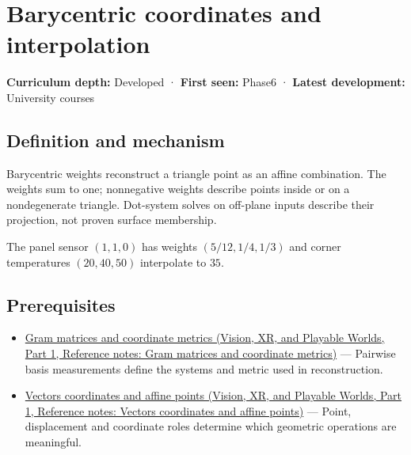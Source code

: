 \hypertarget{appendix-02b9d9a81dca}{}\label{referencestart:appendix-02b9d9a81dca}
\section{Barycentric coordinates and interpolation}\label{appendix-02b9d9a81dca-barycentric-coordinates-and-interpolation}

\hypertarget{appendix-02b9d9a81dca-barycentric-coordinates-and-interpolation}{}

\textbf{Curriculum depth:} Developed · \textbf{First seen:} Phase6 · \textbf{Latest development:} University courses

\begin{allmightroledefinition}

\subsection{Definition and mechanism}\label{appendix-02b9d9a81dca-definition-and-mechanism}

\hypertarget{appendix-02b9d9a81dca-definition-and-mechanism}{}

Barycentric weights reconstruct a triangle point as an affine combination. The weights sum to one; nonnegative weights describe points inside or on a nondegenerate triangle. Dot-system solves on off-plane inputs describe their projection, not proven surface membership.

\end{allmightroledefinition}

The panel sensor \((1,1,0)\) has weights \((5/12,1/4,1/3)\) and corner temperatures \((20,40,50)\) interpolate to \(35\).

\subsection{Prerequisites}\label{appendix-02b9d9a81dca-prerequisites}

\hypertarget{appendix-02b9d9a81dca-prerequisites}{}

\begin{itemize}
\tightlist
\item
  \href{../07-Vision-XR-and-Playable-Worlds-P01/main.pdf\#appendix-3b863809f82a}{Gram matrices and coordinate metrics (Vision, XR, and Playable Worlds, Part 1, Reference notes: Gram matrices and coordinate metrics)} --- Pairwise basis measurements define the systems and metric used in reconstruction.
\item
  \href{../07-Vision-XR-and-Playable-Worlds-P01/main.pdf\#appendix-0659864c0aa3}{Vectors coordinates and affine points (Vision, XR, and Playable Worlds, Part 1, Reference notes: Vectors coordinates and affine points)} --- Point, displacement and coordinate roles determine which geometric operations are meaningful.
\end{itemize}

